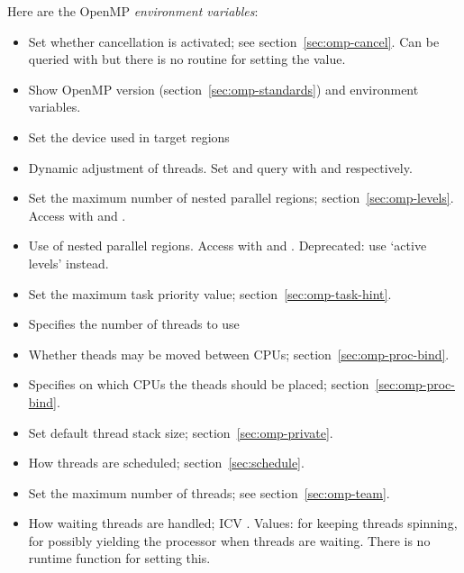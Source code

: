 Here are the OpenMP \emph{environment variables}:
\begin{itemize}
\item {} Set whether cancellation is activated;
  see section~\ref{sec:omp-cancel}.
  Can be queried with  but there is no
  routine for setting the value.
\item {} Show OpenMP version (section~\ref{sec:omp-standards})
  and environment variables.
\item {} Set the device used in target regions
\item {} Dynamic adjustment of threads.
  Set and query with   and 
  respectively.
\item {} Set the maximum number of nested parallel
  regions; section~\ref{sec:omp-levels}.
  Access with   and
  .
\item {} Use of nested parallel regions.
  Access with  and .
  Deprecated: use `active levels' instead.
\item {} Set the maximum task priority value;
  section~\ref{sec:omp-task-hint}.
\item {} Specifies the number of threads to use
\item {} Whether theads may be moved between CPUs;
  section~\ref{sec:omp-proc-bind}.
\item {} Specifies on which CPUs the theads should be placed;
  section~\ref{sec:omp-proc-bind}.
\item {} Set default thread stack size;
  section~\ref{sec:omp-private}.
\item {} How threads are scheduled;
  section~\ref{sec:schedule}.
\item {} Set the maximum number of threads;
  see section~\ref{sec:omp-team}.
\item {} How waiting threads are
  handled; \ac{ICV} . Values:
   for keeping threads spinning,  for possibly
  yielding the processor when threads are waiting.
  There is no runtime function for setting this.
\end{itemize}


